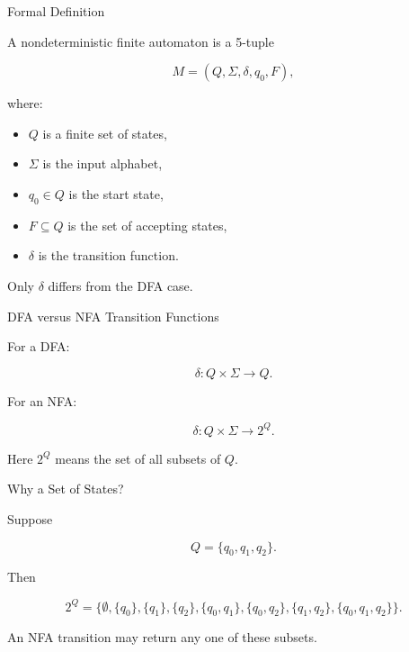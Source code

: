 \documentclass[10pt,aspectratio=169]{beamer}
\newcommand{\powset}[1]{2^{#1}}
\begin{document}
\begin{frame}{Formal Definition}

A nondeterministic finite automaton is a 5-tuple

\[
M=(Q,\Sigma,\delta,q_0,F),
\]

where:

\begin{itemize}
\item \(Q\) is a finite set of states,
\item \(\Sigma\) is the input alphabet,
\item \(q_0\in Q\) is the start state,
\item \(F\subseteq Q\) is the set of accepting states,
\item \(\delta\) is the transition function.
\end{itemize}

\vspace{0.5em}

Only \(\delta\) differs from the DFA case.

\end{frame}

\begin{frame}{DFA versus NFA Transition Functions}

For a DFA:

\[
\delta:Q\times\Sigma\rightarrow Q.
\]

For an NFA:

\[
\delta:Q\times\Sigma\rightarrow \powset{Q}.
\]

\vspace{1em}

Here \(\powset{Q}\) means the set of all subsets of \(Q\).

\end{frame}

\begin{frame}{Why a Set of States?}

Suppose

\[
Q=\{q_0,q_1,q_2\}.
\]

Then

\[
\powset{Q}
=
\{
\emptyset,
\{q_0\},
\{q_1\},
\{q_2\},
\{q_0,q_1\},
\{q_0,q_2\},
\{q_1,q_2\},
\{q_0,q_1,q_2\}
\}.
\]

\vspace{0.5em}

An NFA transition may return any one of these subsets.

\end{frame}
\end{document}
